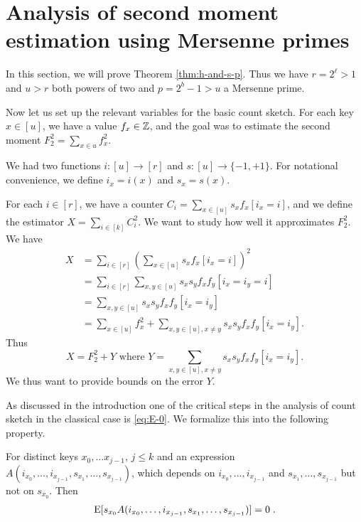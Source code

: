 


\section{Analysis of second moment estimation using  Mersenne primes}\label{sec:analysis-two-for-one}
In this section, we will prove Theorem \ref{thm:h-and-s-p}.  Thus we
have $r=2^\ell>1$ and $u>r$ both powers of two and $p=2^b-1>u$ a
Mersenne prime.

Now let us set up the relevant variables for the basic count sketch.
For each key $x\in [u]$, we have a value $f_x\in \mathbb Z$, and the
goal was to estimate the second moment $F_2^2 = \sum_{x\in u}f_x^2$.

We had two functions $i:[u]\to[r]$ and $s:[u]\to\{-1,+1\}$. 
For notational convenience, we define $i_x=i(x)$ and $s_x=s(x)$.

For each $i\in [r]$, we have a counter 
$C_i=\sum_{x\in[u]} s_x f_x[i_x=i]$, and we define the 
estimator $X=\sum_{i\in[k]} C_i^2$. We want to study how
well it approximates $F_2^2$.
We have 
\begin{align*}
X&=\sum_{i\in[r]}\left( \sum_{x\in[u]}s_x f_x[i_x=i]\right)^2\\
&=\sum_{i\in[r]}\sum_{x,y\in[u]}s_x s_y f_x f_y [i_x = i_y = i]\\
&=\sum_{x,y\in[u]}s_x s_y f_x f_y[i_x=i_y]\\
&=\sum_{x\in[u]} f_x^2+\sum_{x,y\in[u],x\neq y} s_x s_y f_x f_y[i_x=i_y] .
\end{align*}
Thus 
\begin{equation}\label{eq:decomp}
   X=F_2^2 + Y \mbox{ where } Y=\sum_{x,y\in[u],x\neq y} s_x s_y f_x f_y [i_x = i_y] .
\end{equation}
We thus want to provide bounds on the error $Y$.

As discussed in the introduction one of the critical steps in the analysis
of count sketch in the classical case is \cref{eq:E-0}. We formalize this into
the following property.
\begin{property}\label{prop:independence}
    For distinct keys $x_0, \ldots x_{j - 1}$, $j \le k$
    and an expression $A(i_{x_0}, \ldots, i_{x_{j - 1}}, s_{x_1}, \ldots, s_{x_{j - 1}})$,
    which depends on $i_{x_0}, \ldots, i_{x_{j - 1}}$ and $s_{x_1}, \ldots, s_{x_{j - 1}}$
    but not on $s_{x_0}$. Then
    \begin{align}
        \operatorname*{E}[s_{x_0} A(i_{x_0}, \ldots, i_{x_{j - 1}}, s_{x_1}, \ldots, s_{x_{j - 1}})] = 0\; .
    \end{align}
\end{property}

